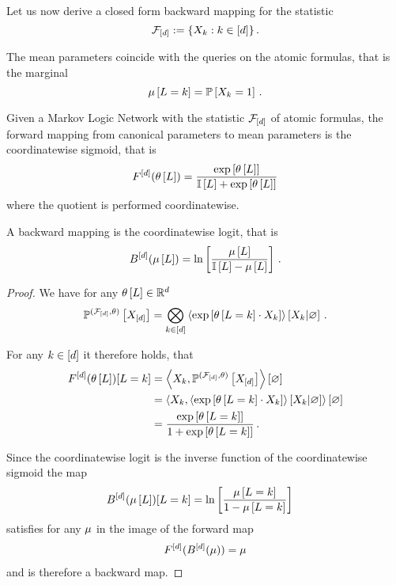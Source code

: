 
Let us now derive a closed form backward mapping for the statistic
	\[ \mathcal{F}_{[d]} := \{X_{k}: k\in[d]\} \, . \]

The mean parameters coincide with the queries on the atomic formulas, that is the marginal
	\[ \mu\left[L=k\right] = \mathbb{P}\left[X_{k}=1\right]  \, . \]

\begin{theorem}
	Given a Markov Logic Network with the statistic $\mathcal{F}_{[d]}$ of atomic formulas, the forward mapping from canonical parameters to mean parameters is the coordinatewise sigmoid, that is
		\[ F^{[d]}(\theta\left[L\right]) = \frac{\mathrm{exp}\left[\theta\left[L\right]\right]}{\mathbb{I}\left[L\right]+\mathrm{exp}\left[\theta\left[L\right]\right]}   \]
	where the quotient is performed coordinatewise.

	A backward mapping is the coordinatewise logit, that is
		\[ B^{[d]}(\mu\left[L\right])
		= \ln \left[ \frac{
			\mu\left[L\right]
			}{
			\mathbb{I}\left[L\right]-\mu\left[L\right]
			} \right]  \, . \]
\end{theorem}
\begin{proof}
	We have for any $\theta\left[L\right]\in\mathbb{R}^{d}$
		\[ \mathbb{P}^{(\mathcal{F}_{[d]},\theta)}\left[X_{[d]}\right]
		= \bigotimes_{k\in[d]} \left\langle \mathrm{exp}\left[\theta\left[L=k\right]\cdot X_{k}\right]\right\rangle \left[ X_{k} | \varnothing \right]  \, . \]


	For any $k\in[d]$ it therefore holds, that
	\begin{align*}
		F^{[d]}(\theta\left[L\right])[L=k]
		&=\left\langle X_{k},  \mathbb{P}^{(\mathcal{F}_{[d]},\theta)}\left[X_{[d]}\right]\right\rangle \left[ \varnothing \right] \\
		&=\left\langle X_{k},  \left\langle \mathrm{exp}\left[\theta\left[L=k\right]\cdot X_{k}\right]\right\rangle \left[ X_{k} | \varnothing \right]\right\rangle \left[ \varnothing \right] \\
		& = \frac{\mathrm{exp}\left[\theta\left[L=k\right]\right]}{1+\mathrm{exp}\left[\theta\left[L=k\right]\right]} \, .
	\end{align*}

	Since the coordinatewise logit is the inverse function of the coordinatewise sigmoid the map
	\begin{align*}
		B^{[d]}(\mu\left[L\right])[L=k]
		& = \ln \left[ \frac{\mu\left[L=k\right]}{1- \mu\left[L=k\right]} \right]
	\end{align*}
	satisfies for any $\mu$ in the image of the forward map
	\begin{align*}
		F^{[d]}(B^{[d]}(\mu)) = \mu
	\end{align*}
	and is therefore a backward map.
\end{proof}


